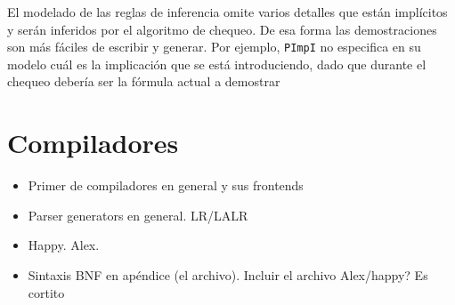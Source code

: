 El modelado de las reglas de inferencia omite varios detalles que están
implícitos y serán inferidos por el algoritmo de chequeo. De esa forma las
demostraciones son más fáciles de escribir y generar. Por ejemplo,
\texttt{PImpI} no especifica en su modelo cuál es la implicación que se está
introduciendo, dado que durante el chequeo debería ser la fórmula actual a
demostrar

\section{Compiladores}
\begin{itemize}
    \item Primer de compiladores en general y sus frontends
    \item Parser generators en general. LR/LALR
    \item Happy. Alex.
    \item Sintaxis BNF en apéndice (el archivo). Incluir el archivo Alex/happy? Es cortito
\end{itemize}